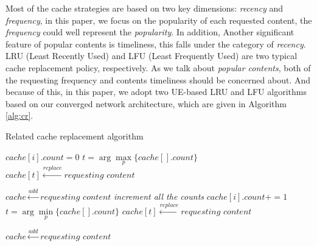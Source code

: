 \documentclass[conference]{IEEEtran}
\begin{document}
Most of the cache strategies are based on two key dimensions: \emph{recency} and \emph{frequency}, in this paper, we focus on the popularity of each requested content, the  \emph{frequency} could well represent the \emph{popularity}. In addition, Another significant feature of popular contents is timeliness, this falls under the category of \emph{recency}. 
LRU (Least Recently Used) and LFU (Least Frequently Used)  are two typical cache replacement policy, respectively. 
As we talk about \emph{popular contents}, both of  the requesting frequency and contents timeliness should be concerned about. And because of this, in this  paper, we adopt two UE-based LRU and LFU algorithms based on our converged network architecture, which are given in Algorithm \ref{alg:cr}.
\begin{algorithm}
\caption{ Related cache replacement algorithm}
\label{alg:cr}
\begin{algorithmic}[1]
 {}
\State $cache[i].count = 0 $
\Else
{}
\State $t = \arg \max \limits_{p} \{cache[].count\}$
\State $cache[t]\stackrel{replace}{\longleftarrow} \textit{requesting content}$

\Else
\State $cache\stackrel{add}{\longleftarrow} \textit{requesting content}$
\EndIf
\EndIf
\State \textit{increment all the counts}
\EndFor
\EndProcedure
{} {}
\State $cache[i].count += 1 $
\Else
{}
\State $t = \arg \min \limits_{p} \{cache[].count\}$
\State $cache[t]\stackrel{replace}{\longleftarrow} \textit{requesting content}$

\Else
\State $cache\stackrel{add}{\longleftarrow} \textit{requesting content}$
\EndIf
\EndIf
\EndFor
\EndProcedure
\end{algorithmic}
\end{algorithm}
\end{document}
